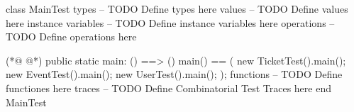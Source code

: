 \begin{vdmpp}[breaklines=true]
class MainTest
types
-- TODO Define types here
values
-- TODO Define values here
instance variables
-- TODO Define instance variables here
operations
-- TODO Define operations here
 
(*@
\label{main:11}
@*)
 public static main: () ==> ()
 main() == (
  new TicketTest().main();
  new EventTest().main();
  new UserTest().main();
 );
functions
-- TODO Define functiones here
traces
-- TODO Define Combinatorial Test Traces here
end MainTest
\end{vdmpp}
